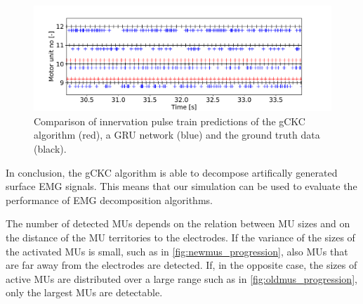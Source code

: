 \begin{figure}
  \centering%
  \includegraphics[width=\textwidth]{images/results/application/gru2.pdf}%
  \caption{Comparison of innervation pulse train predictions of the gCKC algorithm (red), a GRU network (blue) and the ground truth data (black).}%
  \label{fig:gru_result}%
\end{figure}


In conclusion, the gCKC algorithm is able to decompose artifically generated surface EMG signals. This means that our simulation can be used to evaluate the performance of EMG decomposition algorithms.

The number of detected MUs depends on the relation between MU sizes and on the distance of the MU territories to the electrodes. If the variance of the sizes of the activated MUs is small, such as in \cref{fig:newmus_progression}, also MUs that are far away from the electrodes are detected. If, in the opposite case, the sizes of active MUs are distributed over a large range such as in \cref{fig:oldmus_progression}, only the largest MUs are detectable.

